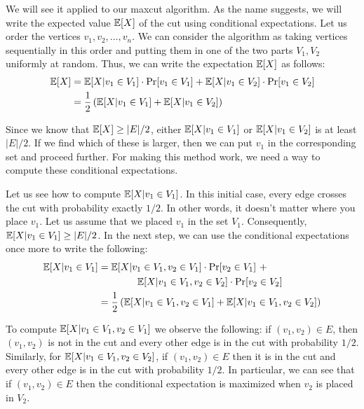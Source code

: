 We will see it applied to our maxcut algorithm. As
the name suggests, we will write the expected value $\mathbb{E}[X]$ of the cut using
conditional expectations. Let us order the vertices $v_1, v_2, \ldots, v_n$. We
can consider the algorithm as taking vertices sequentially in this order and
putting them in one of the two parts $V_1, V_2$ uniformly at random. Thus, we can write the expectation $\mathbb{E}[X]$ as follows:
\begin{align*}
  \mathbb{E}[X] &= \mathbb{E}[X|v_1 \in V_1]\cdot \Pr[v_1 \in V_1] + \mathbb{E}[X|v_1 \in V_2]\cdot \Pr[v_1\in V_2]\\
  &= \frac{1}{2} \left( \mathbb{E}[X|v_1 \in V_1] + \mathbb{E}[X|v_1 \in V_2] \right)
\end{align*}

Since we know that $\mathbb{E}[X] \geq |E|/2$, either $\mathbb{E}[X|v_1\in V_1]$ or
$\mathbb{E}[X|v_1\in V_2]$ is at least $|E|/2$. If we find which of these is larger,
then we can put $v_1$ in the corresponding set and proceed further.
For making this method work, we need a way to compute these
conditional expectations.

Let us see how to compute $\mathbb{E}[X|v_1\in V_1]$. In this initial case, every edge
crosses the cut with probability exactly $1/2$. In other words, it doesn't
matter where you place $v_1$. Let us assume that we placed $v_1$ in the set
$V_1$. Consequently, $\mathbb{E}[X|v_1 \in V_1] \geq |E|/2$. In the next step, we can
use the conditional expectations once more to write the following:
\begin{align*}
  \mathbb{E}[X|v_1\in V_1] &= \mathbb{E}[X|v_1\in V_1, v_2\in V_1] \cdot \Pr[v_2\in V_1]~ +~ \\
                   &\qquad\qquad  \mathbb{E}[X|v_1\in V_1, v_2\in V_2] \cdot \Pr[v_2\in V_2]\\
 &= \frac{1}{2} \left(\mathbb{E}[X|v_1\in V_1, v_2\in V_1] + \mathbb{E}[X|v_1\in V_1, v_2\in V_2] \right)
\end{align*}

To compute $\mathbb{E}[X| v_1 \in V_1, v_2 \in V_1]$ we observe the following: if
$(v_1, v_2)\in E$, then $(v_1, v_2)$ is not in the cut and every other edge is
in the cut with probability $1/2$. Similarly, for
$\mathbb{E}[X|v_1\in V_1, v_2\in V_2]$, if $(v_1,v_2)\in E$ then it is in the cut and
every other edge is in the cut with probability $1/2$. In particular, we can see
that if $(v_1, v_2)\in E$ then the conditional expectation is maximized when
$v_2$ is placed in $V_2$.

